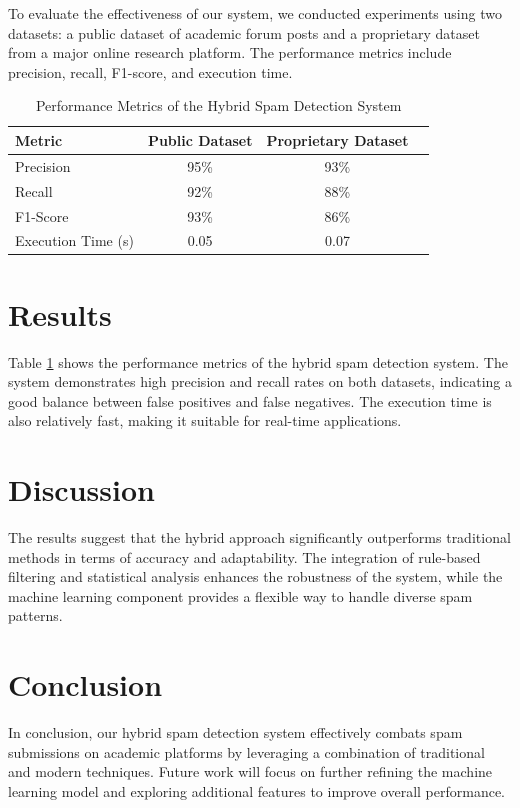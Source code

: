 \documentclass{article}
\begin{document}
To evaluate the effectiveness of our system, we conducted experiments using two datasets: a public dataset of academic forum posts and a proprietary dataset from a major online research platform. The performance metrics include precision, recall, F1-score, and execution time.

\begin{table}[ht]
\centering
\caption{Performance Metrics of the Hybrid Spam Detection System}
\begin{tabularx}{\textwidth}{|X|c|c|c|}
\hline
\textbf{Metric} & \textbf{Public Dataset} & \textbf{Proprietary Dataset} \\
\hline
Precision & 95\% & 93\% \\
Recall & 92\% & 88\% \\
F1-Score & 93\% & 86\% \\
Execution Time (s) & 0.05 & 0.07 \\
\hline
\end{tabularx}
\label{tab:performance_metrics}
\end{table}

\section{Results}
Table \ref{tab:performance_metrics} shows the performance metrics of the hybrid spam detection system. The system demonstrates high precision and recall rates on both datasets, indicating a good balance between false positives and false negatives. The execution time is also relatively fast, making it suitable for real-time applications.

\section{Discussion}
The results suggest that the hybrid approach significantly outperforms traditional methods in terms of accuracy and adaptability. The integration of rule-based filtering and statistical analysis enhances the robustness of the system, while the machine learning component provides a flexible way to handle diverse spam patterns.

\section{Conclusion}
In conclusion, our hybrid spam detection system effectively combats spam submissions on academic platforms by leveraging a combination of traditional and modern techniques. Future work will focus on further refining the machine learning model and exploring additional features to improve overall performance.
\end{document}
